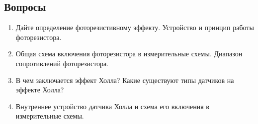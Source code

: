 \documentclass[12pt]{article}
\begin{document}
\subsection{Вопросы}

\begin{enumerate}
    \def\labelenumi{\arabic{enumi}.}
    \item
      Дайте определение фоторезистивному эффекту. Устройство и принцип работы фоторезистора.
    \item
      Общая схема включения фоторезистора в измерительные схемы. Диапазон сопротивлений фоторезистора.
    \item
      В чем заключается эффект Холла? Какие существуют типы датчиков на эффекте Холла?
    \item
      Внутреннее устройство датчика Холла и схема его включения в измерительные схемы.
\end{enumerate}
\end{document}
